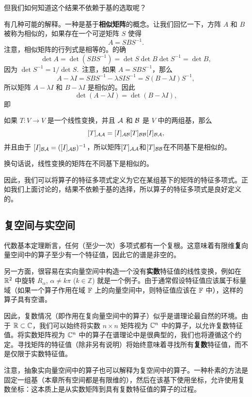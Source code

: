 但我们如何知道这个结果不依赖于基的选取呢？

有几种可能的解释。一种是基于\textbf{相似矩阵}的概念。让我们回忆一下，方阵 $A$ 和 $B$ 被称为相似的，如果存在一个可逆矩阵 $S$ 使得
$$A = SBS^{-1}.$$
注意，相似矩阵的行列式是相等的。的确
$$\det A = \det(SBS^{-1}) = \det S \det B \det S^{-1} = \det B,$$
因为 $\det S^{-1} = 1/\det S$.~注意，如果 $A = SBS^{-1}$，那么
$$A - \lambda I = SBS^{-1} - \lambda SIS^{-1} = S(B - \lambda I)S^{-1},$$
所以矩阵 $A - \lambda I$ 和 $B - \lambda I$ 是相似的。因此
$$\det(A - \lambda I) = \det(B - \lambda I),$$
即\\


如果 $T: V \to V$ 是一个线性变换，并且 $\mathcal{A}$ 和 $\mathcal{B}$ 是 $V$ 中的两组基，那么
$$[T]_{\mathcal{A}\mathcal{A}} = [I]_{\mathcal{A}\mathcal{B}}[T]_{\mathcal{B}\mathcal{B}}[I]_{\mathcal{B}\mathcal{A}},$$
并且由于 $[I]_{\mathcal{B}\mathcal{A}} = ([I]_{\mathcal{A}\mathcal{B}})^{-1}$，所以矩阵$[T]_{\mathcal{A}\mathcal{A}}$和$[T]_{\mathcal{B}\mathcal{B}}$在不同基下是相似的。

换句话说，线性变换的矩阵在不同基下是相似的。

因此，我们可以将算子的特征多项式定义为它在某组基下的矩阵的特征多项式。正如我们上面讨论的，结果不依赖于基的选择，所以算子的特征多项式是良好定义的。

\subsection{复空间与实空间}\label{sec:04-01-04}

代数基本定理断言，任何（至少一次）多项式都有一个复根。这意味着有限维\textbf{复}向量空间中的算子至少有一个特征值，因此它的谱是非空的。

另一方面，很容易在实向量空间中构造一个没有\textbf{实数}特征值的线性变换，例如在 $\mathbb{R}^2$ 中旋转 $R_\alpha$, $\alpha \neq k\pi$ ($k \in \mathbb{Z}$) 就是一个例子。由于通常假设特征值应该属于标量域（如果一个算子作用在域 $\mathbb{F}$ 上的向量空间中，则特征值应该在 $\mathbb{F}$ 中），这样的算子具有空谱。

因此，复数情况（即作用在复向量空间中的算子）似乎是谱理论最自然的环境。由于 $\mathbb{R} \subset \mathbb{C}$，我们可以始终将实数 $n \times n$ 矩阵视为 $\mathbb{C}^n$ 中的算子，以允许复数特征值。将实数矩阵视为 $\mathbb{C}^n$ 中的算子在谱理论中是很典型的，我们也将遵循这个约定。寻找矩阵的特征值（除非另有说明）将始终意味着寻找所有\textbf{复数}特征值，而不是仅限于实数特征值。

注意，抽象实向量空间中的算子也可以解释为复空间中的算子。一种朴素的方法是固定一组基（本章所有空间都是有限维的），然后在该基下使用坐标，允许使用复数坐标：这本质上是从实数矩阵到具有复数特征值的算子的过程。

